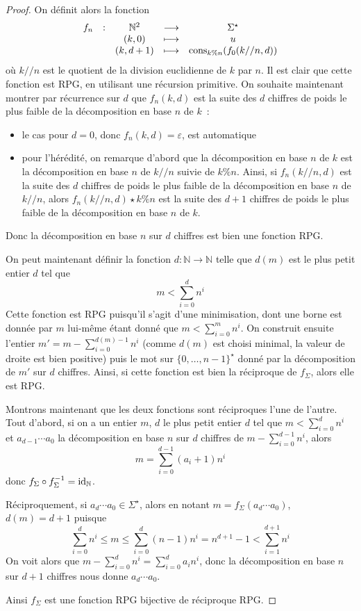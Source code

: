 \begin{proof}
  On définit alors la fonction
  \[\begin{array}{ccccc}
  f_n &: & \mathbb N^2 &\longrightarrow & \Sigma^\star\\
  & & (k,0) & \longmapsto & u\\
  & & (k,d + 1) & \longmapsto & \operatorname{cons}_{k\% n}(f_0(k//n,d))
  \end{array}\]
  où $k//n$ est le quotient de la division euclidienne de $k$ par $n$. Il est
  clair que cette fonction est RPG, en utilisant une récursion primitive. On
  souhaite maintenant montrer par récurrence sur $d$ que
  $f_n(k,d)$ est la suite des $d$ chiffres de poids le plus faible de la
  décomposition en base $n$ de $k$~:
  \begin{itemize}
  \item le cas pour $d = 0$, donc $f_n(k,d) = \varepsilon$, est automatique
  \item pour l'hérédité, on remarque d'abord que la décomposition en base
    $n$ de $k$ est la décomposition en base $n$ de $k//n$ suivie de
    $k \% n$. Ainsi, si $f_n(k//n,d)$ est la suite des $d$ chiffres de poids le
    plus faible de la décomposition en base $n$ de $k//n$, alors
    $f_n(k//n,d)\star k\%n$ est la suite des $d + 1$ chiffres de poids le plus
    faible de la décomposition en base $n$ de $k$.
  \end{itemize}
  Donc la décomposition en base $n$ sur $d$ chiffres est bien une fonction RPG.

  On peut maintenant définir la fonction $d : \mathbb N \to \mathbb N$ telle que
  $d(m)$ est le plus petit entier $d$ tel que
  \[m < \sum_{i = 0}^d n^i\]
  Cette fonction est RPG puisqu'il s'agit d'une minimisation, dont une borne
  est donnée par $m$ lui-même étant donné que $m < \sum_{i = 0}^m n^i$.
  On construit ensuite l'entier $m' = m - \sum_{i = 0}^{d(m)-1} n^i$ (comme $d(m)$
  est choisi minimal, la valeur de droite est bien positive) puis le
  mot sur $\{0,\ldots,n-1\}^\star$ donné par la décomposition de $m'$ sur
  $d$ chiffres. Ainsi, si cette fonction est bien la réciproque de $f_\Sigma$,
  alors elle est RPG.

  Montrons maintenant que les deux fonctions sont réciproques l'une de l'autre.
  Tout d'abord, si on a un entier $m$, $d$ le plus petit entier $d$ tel que
  $m < \sum_{i = 0}^d n^i$ et $a_{d-1}\cdots a_0$ la décomposition en base
  $n$ sur $d$ chiffres de $m - \sum_{i = 0}^{d-1}n^i$, alors
  \[m = \sum_{i=0}^{d-1} (a_i + 1)n^i\]
  donc $f_\Sigma\circ f_\Sigma^{-1} = \operatorname{id}_{\mathbb N}$.

  Réciproquement, si $a_d\cdots a_0\in \Sigma^\star$, alors en notant
  $m = f_\Sigma(a_d\cdots a_0)$, $d(m) = d + 1$ puisque
  \[\sum_{i = 0}^d n^i \leq m \leq \sum_{i = 0}^d (n-1)n^i = n^{d+1} - 1 <
  \sum_{i = 1}^{d+1} n^i\]
  On voit alors que $m - \sum_{i = 0}^d n^i = \sum_{i = 0}^d a_i n^i$, donc la
  décomposition en base $n$ sur $d+1$ chiffres nous donne $a_d\cdots a_0$.

  Ainsi $f_\Sigma$ est une fonction RPG bijective de réciproque RPG.
\end{proof}

